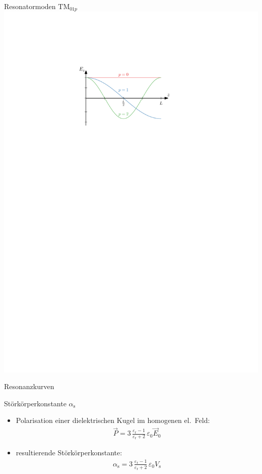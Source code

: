 \documentclass[12pt,xcolor=dvipsnames,professionalfonts]{beamer}
\begin{document}
\begin{frame}{Resonatormoden $\mathrm{TM}_{01p}$}
	\centering
	\includegraphics[scale=1.0]{./figures/longitudinale_periode.pdf}
\end{frame}

\begin{frame}{Resonanzkurven}
	\begin{small}
		\centering
		
	\end{small}
\end{frame}

\begin{frame}{Störkörperkonstante $\alpha_\mathrm{s}$}
	\begin{itemize}
		\item Polarisation einer dielektrischen Kugel im homogenen el.\ Feld:
		\begin{align*}
			  \vec{P} = 3 \, \frac{\varepsilon_\mathrm{r} - 1}{\varepsilon_\mathrm{r} + 2} \, \varepsilon_0 \vec{E}_0
		\end{align*}
		
		\item resultierende Störkörperkonstante:
		\begin{align*}
			\alpha_\mathrm{s} = 3 \, \frac{\varepsilon_\mathrm{r} - 1}{\varepsilon_\mathrm{r} + 2} \, \varepsilon_0 V_\mathrm{s}
		\end{align*}
	\end{itemize}
\end{frame}
\end{document}
